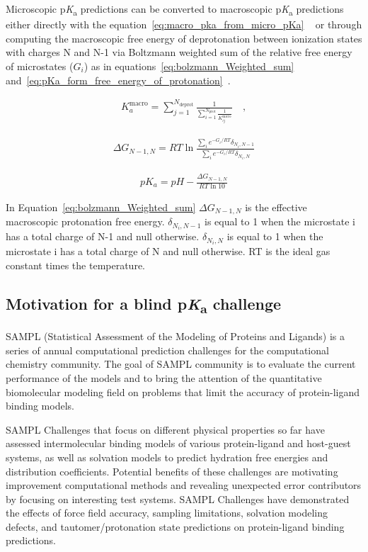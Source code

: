 \documentclass[9pt,lineno,final]{elife}
\newcommand{\pKa}{p\textit{K}\textsubscript{a}}
\begin{document}
Microscopic \pKa{} predictions can be converted to macroscopic \pKa{} predictions either directly with the equation~\ref{eq:macro_pka_from_micro_pKa} ~\citep{Bochevarov:2016:J.Chem.TheoryComput.a} or through computing the macroscopic free energy of deprotonation between ionization states with charges N and N-1 via Boltzmann weighted sum of the relative free energy of microstates ($G_i$) as in equations~\ref{eq:bolzmann_Weighted_sum} and~\ref{eq:pKa_form_free_energy_of_protonation}~\citep{Selwa:2018:J.Comput.AidedMol.Des.}.

\begin{align}
 K_a^\text{macro} = \sum_{j=1}^{N_\text{deprot}} \frac{1}{\sum_{i=1}^{N_\text{prot}}\frac{1}{ K_{ij}^\text{micro}}} \quad, \label{eq:macro_pka_from_micro_pKa}
\end{align}

\begin{align}
  \Delta G_{N-1, N} = RT \ln{\frac{\sum_i e^{-G_i/RT} \delta _{N_i, N-1}}{\sum_i e^{-G_i/RT} \delta _{N_i, N}}}
  \label{eq:bolzmann_Weighted_sum}
\end{align}

\begin{align}
  pK_a = pH - \frac{\Delta G_{N-1, N}}{RT \ln{10}}
  \label{eq:pKa_form_free_energy_of_protonation}
\end{align}

In Equation~\ref{eq:bolzmann_Weighted_sum} $\Delta G_{N-1, N}$ is the effective macroscopic
protonation free energy.  $\delta _{N_i, N-1}$ is equal to 1 when the microstate i has a total charge of N-1 and null otherwise. 
$\delta _{N_i, N}$ is equal to 1 when the microstate i has a total charge of N and null otherwise. RT is the ideal gas constant times the temperature.


\subsection{Motivation for a blind \pKa{} challenge}

SAMPL (Statistical Assessment of the Modeling of Proteins and Ligands) is a series of annual computational prediction challenges for the computational chemistry community. The goal of SAMPL community is to evaluate the current performance of the models and to bring the attention of the quantitative biomolecular modeling field on problems that limit the accuracy of protein-ligand binding models.

SAMPL Challenges that focus on different physical properties so far have assessed intermolecular binding models of various protein-ligand and host-guest systems, as well as solvation models to predict hydration free energies and distribution coefficients. 
Potential benefits of these challenges are motivating improvement computational methods and revealing unexpected error contributors by focusing on interesting test systems. 
SAMPL Challenges have demonstrated the effects of force field accuracy, sampling limitations, solvation modeling defects, and tautomer/protonation state predictions on protein-ligand binding predictions.  
\end{document}
